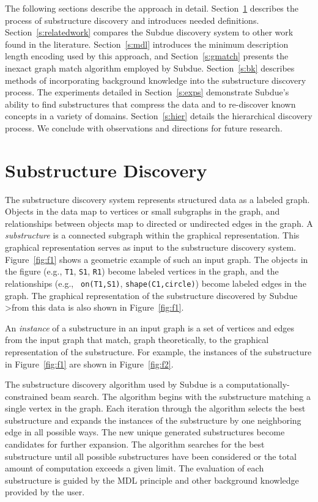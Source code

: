 The following sections describe the approach in detail.
Section~\ref{s:subdue} describes the process of substructure discovery
and introduces needed definitions.  Section~\ref{s:relatedwork} compares
the {\sc Subdue} discovery system to other work found in the literature.
Section~\ref{s:mdl} introduces the minimum description length encoding
used by this approach, and Section~\ref{s:gmatch} presents the inexact
graph match algorithm employed by {\sc Subdue}.  Section~\ref{s:bk}
describes methods of incorporating background knowledge into the substructure
discovery process.  The experiments detailed in Section~\ref{s:exps}
demonstrate {\sc Subdue}'s ability to find substructures that compress the
data and to re-discover known concepts in a variety of domains.
Section~\ref{s:hier} details the hierarchical discovery process.
We conclude with observations and directions for future research.

\section{Substructure Discovery}
\label{s:subdue}

The substructure discovery system represents structured data as a labeled
graph.  Objects in the data map to vertices or small subgraphs in the graph,
and relationships between objects map to directed or undirected
edges in the graph.  A {\em
substructure} is a connected subgraph within the graphical representation.
This graphical representation serves as input to the substructure discovery
system.  Figure~\ref{fig:f1} shows a geometric example of such an input
graph.  The objects in the figure (e.g., {\tt T1}, {\tt S1}, {\tt R1})
become labeled vertices in the graph, and the relationships (e.g., {\tt
on(T1,S1)}, {\tt shape(C1,circle)}) become labeled edges in the graph.  The
graphical representation of the substructure discovered by {\sc Subdue}
>from this data is also shown in Figure~\ref{fig:f1}.



An {\em instance} of a substructure in an input graph is a set of vertices and
edges from the input graph that match, graph theoretically, to the
graphical representation of the substructure.  For example, the instances
of the substructure in Figure~\ref{fig:f1} are shown in
Figure~\ref{fig:f2}.

The substructure discovery algorithm used by {\sc Subdue} is a
computationally-constrained beam search.  The algorithm begins with the
substructure matching
a single vertex in the graph.  Each iteration through the algorithm selects the
best substructure and expands the instances of the substructure by one
neighboring edge in all possible ways.  The new unique generated substructures
become candidates for further expansion.  The algorithm searches for the
best substructure until all possible substructures have been considered or the
total amount of computation exceeds a given limit.  The evaluation of each
substructure is guided by the MDL principle and other background knowledge
provided by the user.

